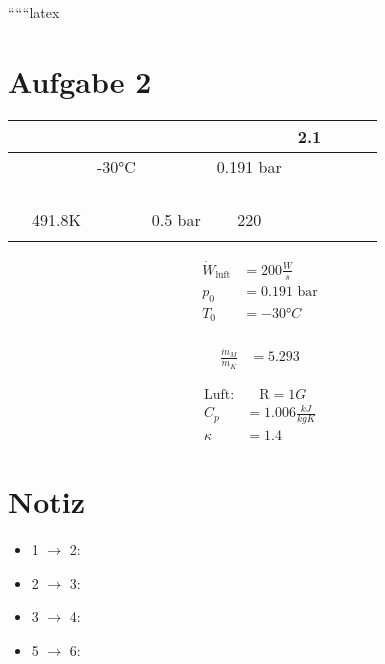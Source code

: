 
``````latex


\section*{Aufgabe 2}

\begin{tabular}{|c|c|c|c|c|c|c|c|}
\hline
{} &  &  &  &  & 2.1 &  &  &  \\
\hline
{} &  & -30°C & & 0.191 bar & & & & \\
\hline
{} & & & & & & & & \\
\hline
{} & & & & & & & & \\
\hline
{} & & & & & & & & \\
\hline
{} & & & & & & & & \\
\hline
{} & 491.8K & & 0.5 bar & 220  & & & & \\
\hline
{} & & & & & & & & \\
\hline
\end{tabular}

\begin{align*}
\dot{W}_{\text{luft}} &= 200 \frac{W}{s} \\
p_0 &= 0.191 \text{ bar} \\
T_0 &= -30°C \\
\end{align*}

\begin{align*}
\frac{\dot{m}_M}{\dot{m}_K} &= 5.293
\end{align*}

\begin{align*}
\text{Luft:} & \quad \text{R} = 1G \\
C_p &= 1.006 \frac{kJ}{kgK} \\
\kappa &= 1.4
\end{align*}

\section*{Notiz}
\begin{itemize}
    \item 1 $\rightarrow$ 2: 
    \item 2 $\rightarrow$ 3: 
    \item 3 $\rightarrow$ 4: 
    \item 5 $\rightarrow$ 6: 
\end{itemize}

